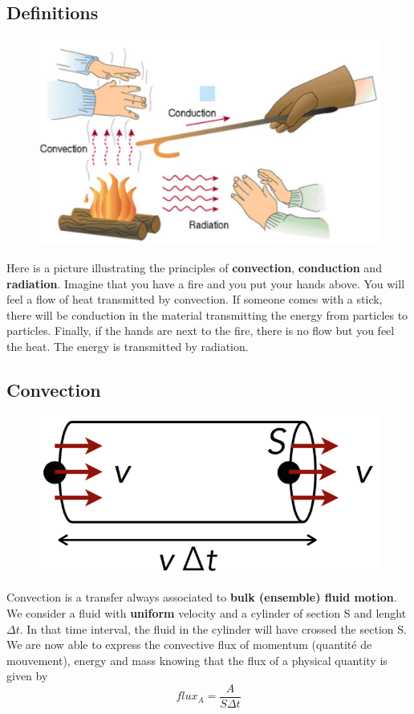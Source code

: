 \subsection{Definitions}
	\begin{figure}
	\vspace{-5mm}
	\includegraphics[scale=0.3]{ch1/1}
	\end{figure}
	Here is a picture illustrating the principles of \textbf{convection}, \textbf{conduction} and \textbf{radiation}. Imagine that you have a fire and you put your hands above. You will feel a flow of heat transmitted by convection. If someone comes with a stick, there will be conduction in the material transmitting the energy from particles to particles. Finally, if the hands are next to the fire, there is no flow but you feel the heat. The energy is transmitted by radiation. 
	
\newpage

\subsection{Convection}
	\begin{figure}
	\vspace{-5mm}
	\includegraphics[scale=0.3]{ch1/2}
	\end{figure}
	Convection is a transfer always associated to \textbf{bulk (ensemble) fluid motion}. We consider a fluid with \textbf{uniform} velocity and a cylinder of section S and lenght $\Delta t$. In that time interval, the fluid in the cylinder will have crossed the section S. We are now able to express the convective flux of momentum (quantité de mouvement), energy and mass knowing that the flux of a physical quantity is given by 
	\begin{equation}
	flux _A = \frac{A}{S\Delta t}
	\label{equation:1.5}
	\end{equation}
	
